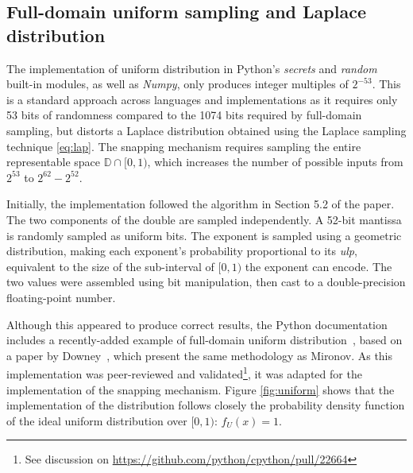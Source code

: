 \documentclass[orivec,envcountsame]{llncs}
\begin{document}
\subsection{Full-domain uniform sampling and Laplace distribution}
The implementation of uniform distribution in Python's \textit{secrets} and \textit{random} built-in modules, as well as \textit{Numpy}, only produces integer multiples of $2^{-53}$. This is a standard approach across languages and implementations as it requires only 53 bits of randomness compared to the 1074 bits required by full-domain sampling, but distorts a Laplace distribution obtained using the Laplace sampling technique \ref{eq:lap}. The snapping mechanism requires sampling the entire representable space $\mathbb{D} \cap [0, 1)$, which increases the number of possible inputs from $2^{53}$ to $2^{62} - 2^{52}$. 

Initially, the implementation followed the algorithm in Section 5.2 of the paper. The two components of the double are sampled independently. A 52-bit mantissa is randomly sampled as uniform bits. The exponent is sampled using a geometric distribution, making each exponent's probability proportional to its \textit{ulp}, equivalent to the size of the sub-interval of $[0, 1)$ the exponent can encode. The two values were assembled using bit manipulation, then cast to a double-precision floating-point number.

Although this appeared to produce correct results, the Python documentation includes a recently-added example of full-domain uniform distribution~\cite{pythonrandom}, based on a paper by Downey~\cite{downey2007generating}, which present the same methodology as Mironov. As this implementation was peer-reviewed and validated\footnote{See discussion on \url{https://github.com/python/cpython/pull/22664}}, it was adapted for the implementation of the snapping mechanism. Figure \ref{fig:uniform} shows that the implementation of the distribution follows closely the probability density function of the ideal uniform distribution over $[0, 1)$: $f_U(x) = 1$.
\end{document}
